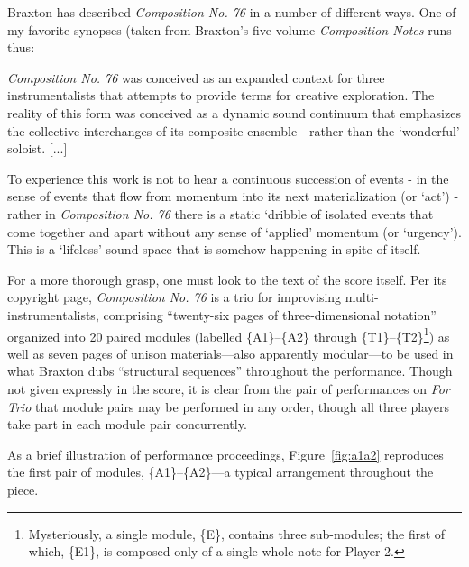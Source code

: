         Braxton has described \textit{Composition No. 76} in a number of different ways. One of my favorite synopses (taken from Braxton's five-volume \textit{Composition Notes} runs thus:

        \begin{smallquote}
            \textit{Composition No. 76} was conceived as an expanded context for three instrumentalists that attempts to provide terms for creative exploration. The reality of this form was conceived as a dynamic sound continuum that emphasizes the collective interchanges of its composite ensemble - rather than the `wonderful' soloist. [...]

            \vspace{7pt}

            \noindent To experience this work is not to hear a continuous succession of events - in the sense of events that flow from momentum into its next materialization (or `act') - rather in \textit{Composition No. 76} there is a static `dribble of isolated events that come together and apart without any sense of `applied' momentum (or `urgency'). This is a `lifeless' sound space that is somehow happening in spite of itself.\autocite[145--8]{Braxton_1988}
        \end{smallquote}
    
        For a more thorough grasp, one must look to the text of the score itself. Per its copyright page, \textit{Composition No. 76} is a trio for improvising multi-instrumentalists, comprising ``twenty-six pages of three-dimensional notation'' organized into 20 paired modules (labelled \{A1\}--\{A2\} through \{T1\}--\{T2\}\footnote{Mysteriously, a single module, \{E\}, contains three sub-modules; the first of which, \{E1\}, is composed only of a single whole note for Player 2.}) as well as seven pages of unison materials---also apparently modular---to be used in what Braxton dubs ``structural sequences'' throughout the performance.\autocite[149]{Braxton_1988} Though not given expressly in the score, it is clear from the pair of performances on \textit{For Trio} that module pairs may be performed in any order, though all three players take part in each module pair concurrently.
        
        As a brief illustration of performance proceedings, Figure~\ref{fig:a1a2} reproduces the first pair of modules, \{A1\}--\{A2\}---a typical arrangement throughout the piece.
    
